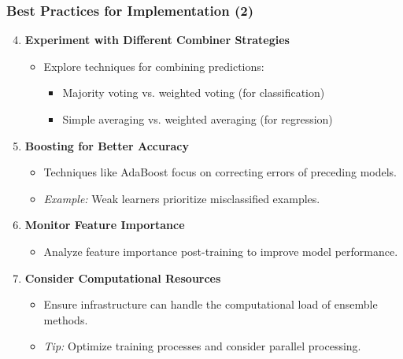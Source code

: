 \documentclass[aspectratio=169]{beamer}
\begin{document}
\begin{frame}[fragile]
    \frametitle{Best Practices for Implementation (2)}
    \begin{enumerate}
        \setcounter{enumi}{3} %
        \item \textbf{Experiment with Different Combiner Strategies}
        \begin{itemize}
            \item Explore techniques for combining predictions:
            \begin{itemize}
                \item Majority voting vs. weighted voting (for classification)
                \item Simple averaging vs. weighted averaging (for regression)
            \end{itemize}
        \end{itemize}
        
        \item \textbf{Boosting for Better Accuracy}
        \begin{itemize}
            \item Techniques like AdaBoost focus on correcting errors of preceding models.
            \item \textit{Example:} Weak learners prioritize misclassified examples.
        \end{itemize}
        
        \item \textbf{Monitor Feature Importance}
        \begin{itemize}
            \item Analyze feature importance post-training to improve model performance.
        \end{itemize}
    
        \item \textbf{Consider Computational Resources}
        \begin{itemize}
            \item Ensure infrastructure can handle the computational load of ensemble methods.
            \item \textit{Tip:} Optimize training processes and consider parallel processing.
        \end{itemize}
    \end{enumerate}
\end{frame}
\end{document}
